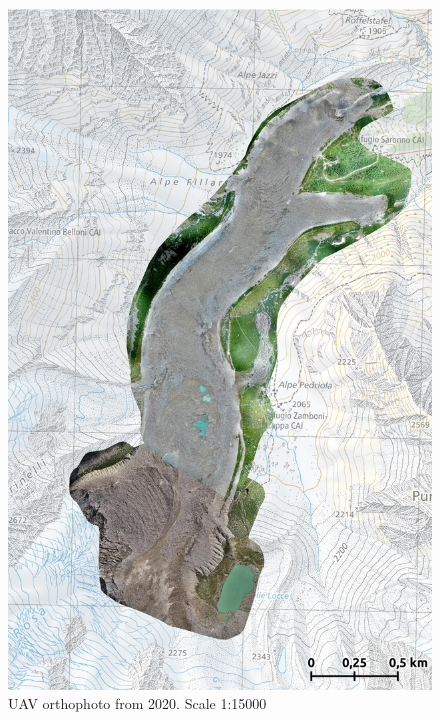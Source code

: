 \begin{figure}[p]
    \centering
    \includegraphics[width=\textwidth]{figures/appendix/orto_2020.jpg}
    \caption{UAV orthophoto from 2020. Scale 1:15000}
\end{figure}

